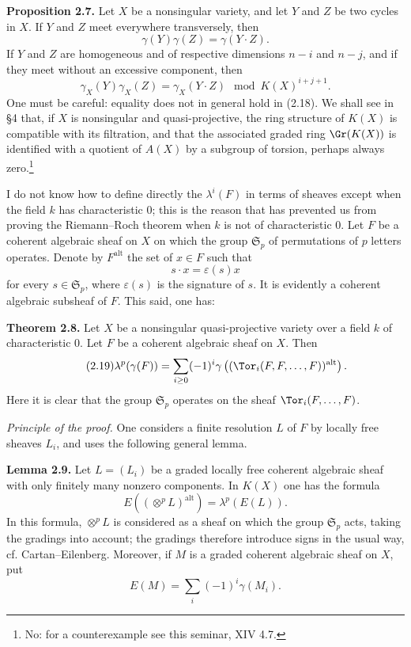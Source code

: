 \textbf{Proposition 2.7.} Let $X$ be a nonsingular variety, and let $Y$ and $Z$ be two cycles in $X$. If $Y$ and $Z$ meet everywhere transversely, then
\begin{equation}\tag{2.17}
 \gamma(Y)\gamma(Z)=\gamma(Y\cdot Z).
\end{equation}
If $Y$ and $Z$ are homogeneous and of respective dimensions $n-i$ and $n-j$, and if they meet without an excessive component, then
\begin{equation}\tag{2.18}
 \gamma_X(Y)\gamma_X(Z)=\gamma_X(Y\cdot Z)\mod K(X)^{i+j+1}.
\end{equation}
One must be careful: equality does not in general hold in (2.18). We shall see in \S 4 that, if $X$ is nonsingular and quasi-projective, the ring structure of $K(X)$ is compatible with its filtration, and that the associated graded ring $\Gr(K(X))$ is identified with a quotient of $A(X)$ by a subgroup of torsion, perhaps always zero.\footnote{No: for a counterexample see this seminar, XIV 4.7.}

I do not know how to define directly the $\lambda^i(F)$ in terms of sheaves except when the field $k$ has characteristic $0$; this is the reason that has prevented us from proving the Riemann--Roch theorem when $k$ is not of characteristic $0$. Let $F$ be a coherent algebraic sheaf on $X$ on which the group $\mathfrak S_p$ of permutations of $p$ letters operates. Denote by $F^{\mathrm{alt}}$ the set of $x\in F$ such that
\[
 s\cdot x=\varepsilon(s)x
\]
for every $s\in\mathfrak S_p$, where $\varepsilon(s)$ is the signature of $s$. It is evidently a coherent algebraic subsheaf of $F$. This said, one has:

\textbf{Theorem 2.8.} Let $X$ be a nonsingular quasi-projective variety over a field $k$ of characteristic $0$. Let $F$ be a coherent algebraic sheaf on $X$. Then
\begin{equation}\tag{2.19}
 \lambda^p(\gamma(F))=\sum_{i\geq 0}(-1)^i\gamma\left((\Tor_i(F,F,\ldots,F))^{\mathrm{alt}}\right).
\end{equation}
Here it is clear that the group $\mathfrak S_p$ operates on the sheaf $\Tor_i(F,\ldots,F)$.

\emph{Principle of the proof.} One considers a finite resolution $L$ of $F$ by locally free sheaves $L_i$, and uses the following general lemma.

\textbf{Lemma 2.9.} Let $L=(L_i)$ be a graded locally free coherent algebraic sheaf with only finitely many nonzero components. In $K(X)$ one has the formula
\begin{equation}\tag{2.20}
 E\left((\otimes^p L)^{\mathrm{alt}}\right)=\lambda^p(E(L)).
\end{equation}
In this formula, $\otimes^pL$ is considered as a sheaf on which the group $\mathfrak S_p$ acts, taking the gradings into account; the gradings therefore introduce signs in the usual way, cf. Cartan--Eilenberg. Moreover, if $M$ is a graded coherent algebraic sheaf on $X$, put
\[
 E(M)=\sum_i(-1)^i\gamma(M_i).
\]

